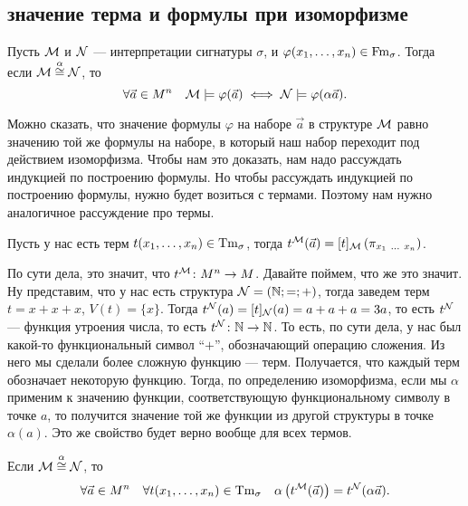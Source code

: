 \subsection{значение терма и формулы при изоморфизме}

\begin{theorem}
    Пусть $\mathcal{M}$ и $\mathcal{N}$ --- интерпретации сигнатуры $\sigma$, и $\varphi(x_{1}, \ldots, x_{n}) \in \mathrm{Fm}_{\sigma}$.
    Тогда если $\mathcal{M} \overset{\alpha}{\cong} \mathcal{N}$, то
    $$
        \forall \vec{a} \in M^{n} \quad \mathcal{M} \models \varphi(\vec{a}) \iff \mathcal{N} \models \varphi(\alpha \vec{a}).
    $$
\end{theorem}

Можно сказать, что значение формулы $\varphi$ на наборе $\vec{a}$ в структуре $\mathcal{M}$ равно значению той же формулы на наборе, в который наш набор переходит под действием изоморфизма.
Чтобы нам это доказать, нам надо рассуждать индукцией по построению формулы.
Но чтобы рассуждать индукцией по построению формулы, нужно будет возиться с термами.
Поэтому нам нужно аналогичное рассуждение про термы.

\begin{definition}
    Пусть у нас есть терм $t(x_{1}, \ldots, x_{n}) \in \mathrm{Tm}_{\sigma}$,
    тогда $t^{\mathcal{M}}(\vec{a}) = [t]_{\mathcal{M}}\left( \pi_{x_{1}~\ldots~x_{n}} \right)$.
\end{definition}

По сути дела, это значит, что $t^{\mathcal{M}} \colon M^{n} \to M$.
Давайте поймем, что же это значит.
Ну представим, что у нас есть структура $\mathcal{N} = (\mathbb{N}; =; +)$, тогда заведем терм $t = x + x + x$, $V(t) = \{x\}$.
Тогда $t^{\mathcal{N}}(a) = [t]_{\mathcal{N}}(a) = a + a + a = 3a$, то есть $t^{\mathcal{N}}$ --- функция утроения числа, то есть $t^{\mathcal{N}} \colon \mathbb{N} \to \mathbb{N}$.
То есть, по сути дела, у нас был какой-то функциональный символ \enquote{$+$}, обозначающий операцию сложения.
Из него мы сделали более сложную функцию --- терм.
Получается, что каждый терм обозначает некоторую функцию.
Тогда, по определению изоморфизма, если мы $\alpha$ применим к значению функции, соответствующую функциональному символу в точке $a$, то получится значение той же функции из другой структуры в точке $\alpha(a)$.
Это же свойство будет верно вообще для всех термов.

\begin{lemma} \label{lem::term-isomorphism}
    Если $\mathcal{M} \overset{\alpha}{\cong} \mathcal{N}$, то
    $$
    \forall \vec{a} \in M^{n} \quad \forall t(x_{1}, \ldots, x_{n}) \in \mathrm{Tm}_{\sigma} \quad \alpha\left(t^{\mathcal{M}}(\vec{a})\right) = t^{\mathcal{N}}(\alpha\vec{a}).
    $$
\end{lemma}

